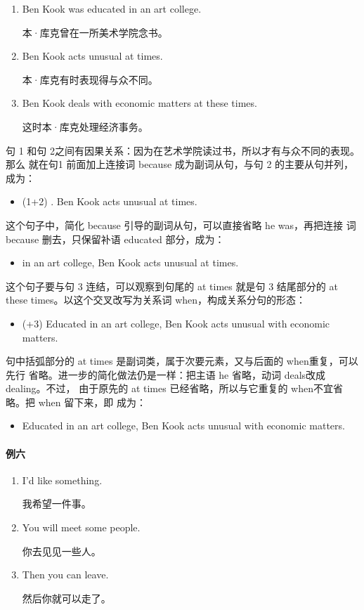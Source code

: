 \begin{enumerate}
\item Ben Kook was educated in an art college.

  本·库克曾在一所美术学院念书。
\item Ben Kook acts unusual at times.

  本·库克有时表现得与众不同。
\item Ben Kook deals with economic matters at these times.

  这时本·库克处理经济事务。
\end{enumerate}

句 1 和句 2之间有因果关系：因为在艺术学院读过书，所以才有与众不同的表现。那么
就在句1 前面加上连接词 because 成为副词从句，与句 2 的主要从句并列，成为：
\begin{itemize}
\item (1+2) . Ben Kook acts unusual at
  times.
\end{itemize}
这个句子中，简化 because 引导的副词从句，可以直接省略 he was，再把连接
词because 删去，只保留补语 educated 部分，成为：
\begin{itemize}
\item {} in an art college, Ben Kook acts unusual at times.
\end{itemize}
这个句子要与句 3 连结，可以观察到句尾的 at times 就是句 3 结尾部分的 at
these times。以这个交叉改写为关系词 when，构成关系分句的形态：
\begin{itemize}
\item (+3) Educated in an art college, Ben Kook acts unusual  with economic matters.
\end{itemize}
句中括弧部分的 at times 是副词类，属于次要元素，又与后面的 when重复，可以先行
省略。进一步的简化做法仍是一样：把主语 he 省略，动词 deals改成 dealing。不过，
由于原先的 at times 已经省略，所以与它重复的 when不宜省略。把 when 留下来，即
成为：

\begin{itemize}
\item Educated in an art college, Ben Kook acts unusual  with
  economic matters.
\end{itemize}

\paragraph{例六}

\begin{enumerate}
\item   I'd like something.

  我希望一件事。
\item   You will meet some people.

  你去见见一些人。
\item   Then you can leave.

  然后你就可以走了。
\end{enumerate}


